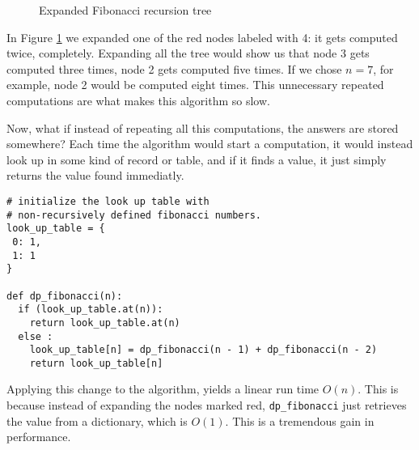 \begin{figure}[ht]
  \centering
  \caption{Expanded Fibonacci recursion tree}
  \label{fig:fib2}
\end{figure}

In Figure \ref{fig:fib2} we expanded one of the red nodes labeled with 4: it gets computed twice, completely.
Expanding all the tree would show us that node 3 gets computed three times, node 2 gets computed five times.
If we chose $n = 7$, for example, node 2 would be computed eight times. This unnecessary repeated
computations are what makes this algorithm so slow.

Now, what if instead of repeating all this computations, the answers are stored somewhere? Each
time the algorithm would start a computation, it would instead look up in some kind of record or table, 
and if it finds a value, it just simply returns the value found immediatly.


\begin{verbatim}
# initialize the look up table with 
# non-recursively defined fibonacci numbers.
look_up_table = {
 0: 1,
 1: 1  
}

def dp_fibonacci(n):
  if (look_up_table.at(n)):
    return look_up_table.at(n)
  else :
    look_up_table[n] = dp_fibonacci(n - 1) + dp_fibonacci(n - 2)
    return look_up_table[n]
\end{verbatim}


Applying this change to the algorithm, yields a linear run time $O(n)$. This is because instead of expanding the
nodes marked red, \texttt{dp\_fibonacci} just retrieves the value from a dictionary, which is $O(1)$. This
is a tremendous gain in performance.